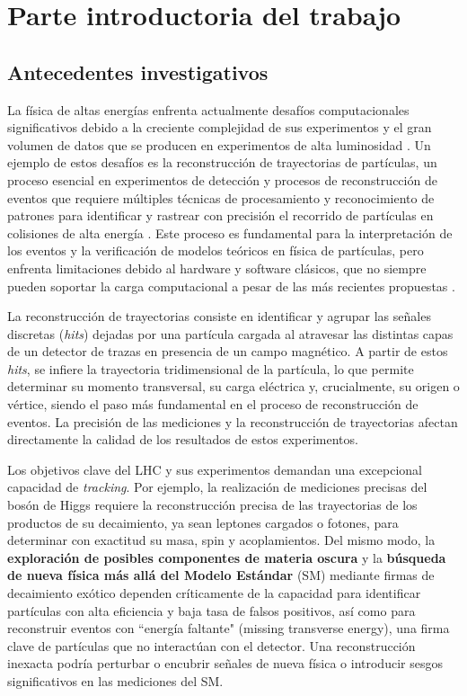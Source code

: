 \chapter{Parte introductoria del trabajo}

\section{Antecedentes investigativos}
La física de altas energías enfrenta actualmente desafíos computacionales significativos debido a la creciente complejidad de sus experimentos y el gran volumen de datos que se producen en experimentos de alta luminosidad \cite{particle}. Un ejemplo de estos desafíos es la reconstrucción de trayectorias de partículas, un proceso esencial en experimentos de detección y procesos de reconstrucción de eventos que requiere múltiples técnicas de procesamiento y reconocimiento de patrones para identificar y rastrear con precisión el recorrido de partículas en colisiones de alta energía \cite{Anastasia2015}. Este proceso es fundamental para la interpretación de los eventos y la verificación de modelos teóricos en física de partículas, pero enfrenta limitaciones debido al hardware y software clásicos, que no siempre pueden soportar la carga computacional a pesar de las más recientes propuestas \cite{SOA}.

La reconstrucción de trayectorias consiste en identificar y agrupar las señales discretas (\textit{hits}) dejadas por una partícula cargada al atravesar las distintas capas de un detector de trazas en presencia de un campo magnético. A partir de estos \textit{hits}, se infiere la trayectoria tridimensional de la partícula, lo que permite determinar su momento transversal, su carga eléctrica y, crucialmente, su origen o vértice, siendo el paso más fundamental en el proceso de reconstrucción de eventos. La precisión de las mediciones y la reconstrucción de trayectorias afectan directamente la calidad de los resultados de estos experimentos.

Los objetivos clave del LHC y sus experimentos demandan una excepcional capacidad de \textit{tracking}. Por ejemplo, la realización de mediciones precisas del bosón de Higgs \cite{Higgs_review} requiere la reconstrucción precisa de las trayectorias de los productos de su decaimiento, ya sean leptones cargados o fotones, para determinar con exactitud su masa, spin y acoplamientos. Del mismo modo, la \textbf{exploración de posibles componentes de materia oscura} y la \textbf{búsqueda de nueva física más allá del Modelo Estándar} (SM) \cite{BeyondSM_review} mediante firmas de decaimiento exótico dependen críticamente de la capacidad para identificar partículas con alta eficiencia y baja tasa de falsos positivos, así como para reconstruir eventos con ``energía faltante" (missing transverse energy), una firma clave de partículas que no interactúan con el detector. Una reconstrucción inexacta podría perturbar o encubrir señales de nueva física o introducir sesgos significativos en las mediciones del SM.


